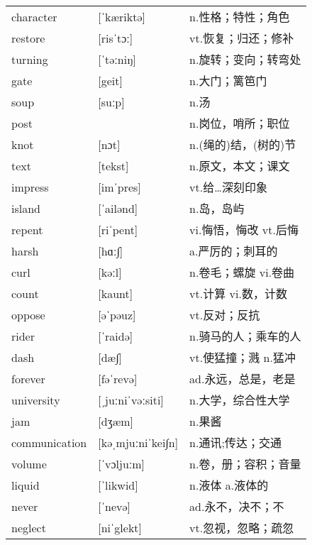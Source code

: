 \documentclass[a4paper]{article}
\begin{document}
\section{}
\begin{tabular}{l l l}

character & [ˈkæriktə] & n.性格；特性；角色 \\
restore & [risˈtɔː] & vt.恢复；归还；修补 \\
turning & [ˈtəːniŋ] & n.旋转；变向；转弯处 \\
gate & [geit] & n.大门；篱笆门 \\
soup & [suːp] & n.汤 \\
post &  & n.岗位，哨所；职位 \\
knot & [nɔt] & n.(绳的)结，(树的)节 \\
text & [tekst] & n.原文，本文；课文 \\
impress & [imˈpres] & vt.给…深刻印象 \\
island & [ˈailənd] & n.岛，岛屿 \\
repent & [riˈpent] & vi.悔悟，悔改 vt.后悔 \\
harsh & [hɑː∫] & a.严厉的；刺耳的 \\
curl & [kəːl] & n.卷毛；螺旋 vi.卷曲 \\
count & [kaunt] & vt.计算 vi.数，计数 \\
oppose & [əˈpəuz] & vt.反对；反抗 \\
rider & [ˈraidə] & n.骑马的人；乘车的人 \\
dash & [dæ∫] & vt.使猛撞；溅 n.猛冲 \\
forever & [fəˈrevə] & ad.永远，总是，老是 \\
university & [ˌjuːniˈvəːsiti] & n.大学，综合性大学 \\
jam & [dʒæm] & n.果酱 \\
communication & [kəˌmjuːniˈkei∫n] & n.通讯;传达；交通 \\
volume & [ˈvɔljuːm] & n.卷，册；容积；音量 \\
liquid & [ˈlikwid] & n.液体 a.液体的 \\
never & [ˈnevə] & ad.永不，决不；不 \\
neglect & [niˈglekt] & vt.忽视，忽略；疏忽 \\

\end{tabular}
\end{document}
